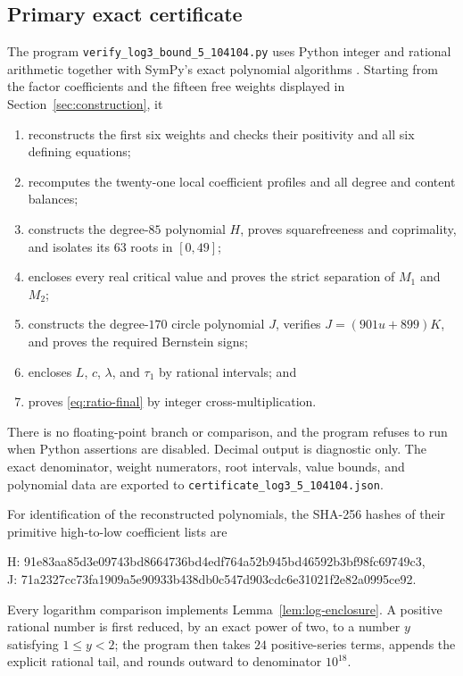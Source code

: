 \documentclass[preprint,12pt]{elsarticle}
\theoremstyle{definition}
\begin{document}
\subsection{Primary exact certificate}

The program \texttt{verify\_log3\_bound\_5\_104104.py} uses Python integer
and rational arithmetic together with SymPy's exact polynomial algorithms
\cite{SymPy2017}.  Starting from the factor coefficients and the fifteen free
weights displayed in Section~\ref{sec:construction}, it
\begin{enumerate}[leftmargin=2em]
\item reconstructs the first six weights and checks their positivity and all
      six defining equations;
\item recomputes the twenty-one local coefficient profiles and all degree and
      content balances;
\item constructs the degree-$85$ polynomial $H$, proves squarefreeness and
      coprimality, and isolates its $63$ roots in $[0,49]$;
\item encloses every real critical value and proves the strict separation of
      $M_1$ and $M_2$;
\item constructs the degree-$170$ circle polynomial $J$, verifies
      $J=(901u+899)K$, and proves the required Bernstein signs;
\item encloses $L$, $c$, $\lambda$, and $\tau_1$ by rational intervals; and
\item proves \eqref{eq:ratio-final} by integer cross-multiplication.
\end{enumerate}
There is no floating-point branch or comparison, and the program refuses to
run when Python assertions are disabled.  Decimal output is diagnostic only.
The exact denominator, weight numerators, root intervals, value bounds, and
polynomial data are exported to
\texttt{certificate\_log3\_5\_104104.json}.

For identification of the reconstructed polynomials, the SHA-256 hashes of
their primitive high-to-low coefficient lists are
\begin{center}
\ttfamily\small
H: 91e83aa85d3e09743bd8664736bd4edf764a52b945bd46592b3bf98fc69749c3,\\
J: 71a2327cc73fa1909a5e90933b438db0c547d903cdc6e31021f2e82a0995ce92.
\end{center}

Every logarithm comparison implements Lemma~\ref{lem:log-enclosure}.  A
positive rational number is first reduced, by an exact power of two, to a
number $y$ satisfying $1\le y<2$;
the program then takes $24$ positive-series terms, appends the explicit
rational tail, and rounds outward to denominator $10^{18}$.
\end{document}
